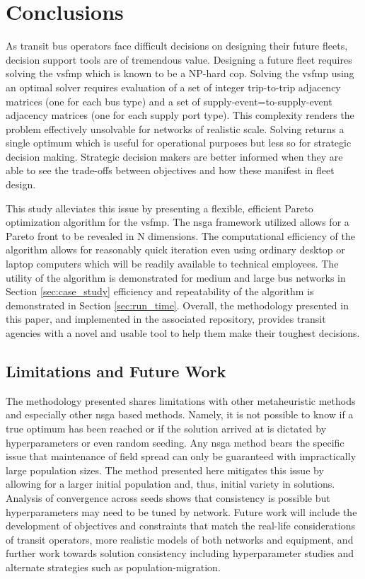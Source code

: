 \section{Conclusions}

As transit bus operators face difficult decisions on designing their future fleets, decision support tools are of tremendous value. Designing a future fleet requires solving the \gls{vsfmp} which is known to be a NP-hard \gls{cop}. Solving the \gls{vsfmp} using an optimal solver requires evaluation of a set of integer trip-to-trip adjacency matrices (one for each bus type) and a set of supply-event=to-supply-event adjacency matrices (one for each supply port type). This complexity renders the problem effectively unsolvable for networks of realistic scale. Solving returns a single optimum which is useful for operational purposes but less so for strategic decision making. Strategic decision makers are better informed when they are able to see the trade-offs between objectives and how these manifest in fleet design.

This study alleviates this issue by presenting a flexible, efficient Pareto optimization algorithm for the \gls{vsfmp}. The \gls{nsga} framework utilized allows for a Pareto front to be revealed in N dimensions. The computational efficiency of the algorithm allows for reasonably quick iteration even using ordinary desktop or laptop computers which will be readily available to technical employees. The utility of the algorithm is demonstrated for medium and large bus networks in Section \ref{sec:case_study} efficiency and repeatability of the algorithm is demonstrated in Section \ref{sec:run_time}. Overall, the methodology presented in this paper, and implemented in the associated repository, provides transit agencies with a novel and usable tool to help them make their toughest decisions.

\subsection{Limitations and Future Work}

The methodology presented shares limitations with other metaheuristic methods and especially other \gls{nsga} based methods. Namely, it is not possible to know if a true optimum has been reached or if the solution arrived at is dictated by hyperparameters or even random seeding. Any \gls{nsga} method bears the specific issue that maintenance of field spread can only be guaranteed with impractically large population sizes. The method presented here mitigates this issue by allowing for a larger initial population and, thus, initial variety in solutions. Analysis of convergence across seeds shows that consistency is possible but hyperparameters may need to be tuned by network. Future work will include the development of objectives and constraints that match the real-life considerations of transit operators, more realistic models of both networks and equipment, and further work towards solution consistency including hyperparameter studies and alternate strategies such as population-migration.

